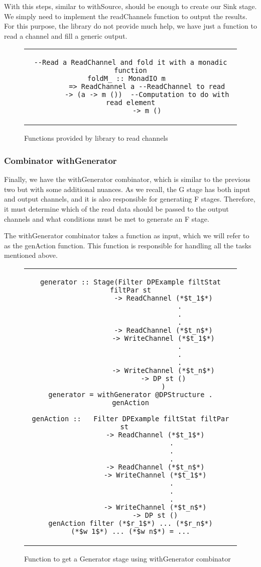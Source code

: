 With this steps, similar to withSource, should be enough to create our Sink stage.
We simply need to implement the readChannels function to output the results.
For this purpose, the library do not provide much help, we have just a function to read a channel and fill a generic output.

\begin{figure}[H]
    \begin{tabular}{c}
        \begin{lstlisting}
--Read a ReadChannel and fold it with a monadic function
foldM_ :: MonadIO m	 
        => ReadChannel a --ReadChannel to read
        -> (a -> m ())  --Computation to do with read element
        -> m ()
        \end{lstlisting}
    \end{tabular}
    \caption[{[Code]}Read channels]{Functions provided by library to read channels}
    \label{fig:HC6}
\end{figure}

\subsubsection*{Combinator withGenerator}
Finally, we have the withGenerator combinator, which is similar to the previous two but with some additional nuances.
As we recall, the G stage has both input and output channels, and it is also responsible for generating F stages.
Therefore, it must determine which of the read data should be passed to the output channels and what conditions must be met to generate an F stage.

The withGenerator combinator takes a function as input, which we will refer to as the genAction function.
This function is responsible for handling all the tasks mentioned above.

\begin{figure}[H]
    \begin{tabular}{c}
        \begin{lstlisting}
generator :: Stage(Filter DPExample filtStat filtPar st
                -> ReadChannel (*$t_1$*)
                        .
                        .
                        .
                -> ReadChannel (*$t_n$*)
                -> WriteChannel (*$t_1$*)
                        .
                        .
                        .
                -> WriteChannel (*$t_n$*)
                -> DP st ()
                )
generator = withGenerator @DPStructure . genAction

genAction ::   Filter DPExample filtStat filtPar st   
            -> ReadChannel (*$t_1$*)
                    .
                    .
                    .
            -> ReadChannel (*$t_n$*)
            -> WriteChannel (*$t_1$*)
                    .
                    .
                    .
            -> WriteChannel (*$t_n$*)
            -> DP st ()
genAction filter (*$r_1$*) ... (*$r_n$*) (*$w_1$*) ... (*$w_n$*) = ...
        \end{lstlisting}
    \end{tabular}
    \caption[{[Code]} withGenerator]{Function to get a Generator stage using withGenerator combinator}
    \label{fig:HC7}
\end{figure}

